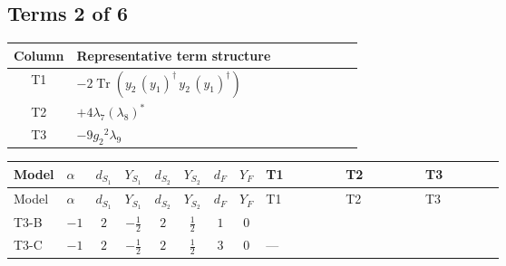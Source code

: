 \documentclass[8pt]{article}
\begin{document}
\begin{landscape}
\subsection*{Terms 2 of 6}
\begin{center}
\begin{tabular}{@{}c >{\raggedright\arraybackslash}p{0.82\linewidth}@{}}
\toprule
Column & Representative term structure \\
\midrule
T1 & \(\displaystyle -2 \operatorname{Tr}\!\left({y_2}\,\left({y_1}\right)^{\dagger}\,{y_2}\,\left({y_1}\right)^{\dagger}\right)\) \\
\midrule
T2 & \(\displaystyle +4 {\lambda_7} \left({\lambda_8}\right)^{*}\) \\
\midrule
T3 & \(\displaystyle -9 {g_2}^2 {\lambda_9}\) \\
\midrule
\bottomrule
\end{tabular}
\end{center}
\smallskip
\tiny
\begin{longtable}{@{}llcccccc >{\raggedright\arraybackslash}p{0.21\linewidth} >{\raggedright\arraybackslash}p{0.21\linewidth} >{\raggedright\arraybackslash}p{0.21\linewidth}@{}}
\toprule
Model & $\alpha$ & $d_{S_1}$ & $Y_{S_1}$ & $d_{S_2}$ & $Y_{S_2}$ & $d_F$ & $Y_F$ & T1 & T2 & T3 \\
\midrule
\endfirsthead
\toprule
Model & $\alpha$ & $d_{S_1}$ & $Y_{S_1}$ & $d_{S_2}$ & $Y_{S_2}$ & $d_F$ & $Y_F$ & T1 & T2 & T3 \\
\midrule
\endhead
T3-B & $-1$ & $2$ & $-\frac{1}{2}$ & $2$ & $\frac{1}{2}$ & $1$ & $0$ & \scriptsize\adjustbox{max width=\linewidth}{$\begin{gathered} -2 \operatorname{Tr}\!\left({y_2}\,\left({y_1}\right)^{\dagger}\,{y_2}\,\left({y_1}\right)^{\dagger}\right)\end{gathered}$} & \scriptsize\adjustbox{max width=\linewidth}{$\begin{gathered} +4 {\lambda_7} \left({\lambda_8}\right)^{*}\end{gathered}$} & \scriptsize\adjustbox{max width=\linewidth}{$\begin{gathered} -9 {g_2}^2 {\lambda_9}\end{gathered}$} \\
\midrule
T3-C & $-1$ & $2$ & $-\frac{1}{2}$ & $2$ & $\frac{1}{2}$ & $3$ & $0$ & --- & \scriptsize\adjustbox{max width=\linewidth}{$\begin{gathered} +4 {\lambda_7} \left({\lambda_8}\right)^{*}\end{gathered}$} & \scriptsize\adjustbox{max width=\linewidth}{$\begin{gathered} -9 {g_2}^2 {\lambda_9}\end{gathered}$} \\

\end{longtable}
\end{landscape}
\end{document}
